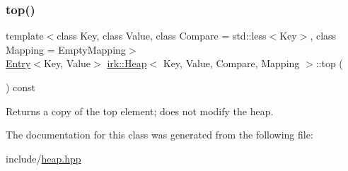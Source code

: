 \mbox{\label{classirk_1_1Heap_a54643e4b569e3fbac56af72e04eb2b6d}} 
\subsubsection{\texorpdfstring{top()}{top()}}
{\footnotesize\ttfamily template$<$class Key, class Value, class Compare = std\+::less$<$\+Key$>$, class Mapping = Empty\+Mapping$>$ \\
\mbox{\hyperlink{structirk_1_1Entry}{Entry}}$<$Key, Value$>$ \mbox{\hyperlink{classirk_1_1Heap}{irk\+::\+Heap}}$<$ Key, Value, Compare, Mapping $>$\+::top (\begin{DoxyParamCaption}{ }\end{DoxyParamCaption}) const\hspace{0.3cm}{\ttfamily [inline]}}



Returns a copy of the top element; does not modify the heap. 



The documentation for this class was generated from the following file\+:\begin{DoxyCompactItemize}
\item 
include/\mbox{\hyperlink{heap_8hpp}{heap.\+hpp}}\end{DoxyCompactItemize}
